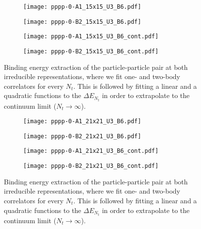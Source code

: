 \begin{figure}
  \begin{subfigure}{.5\textwidth}
    \centering
    \texttt{[image: pppp-0-A1\_15x15\_U3\_B6.pdf]}
  \end{subfigure}%
  \begin{subfigure}{.5\textwidth}
    \centering
    \texttt{[image: pppp-0-B2\_15x15\_U3\_B6.pdf]}
  \end{subfigure}
  \begin{subfigure}{.5\textwidth}
      \centering
      \texttt{[image: pppp-0-A1\_15x15\_U3\_B6\_cont.pdf]}
  \end{subfigure}
  \begin{subfigure}{.5\textwidth}
      \centering
      \texttt{[image: pppp-0-B2\_15x15\_U3\_B6\_cont.pdf]}
  \end{subfigure}
  \caption{Binding energy extraction of the particle-particle pair at both irreducible representations, where we fit one- and two-body correlators for every $N_t$. This is followed by fitting a linear and a quadratic functions to the $\Delta E_{N_t}$ in order to extrapolate to the continuum limit ($N_t\to\infty$).}
  \label{fig:fig9}
\end{figure}

\begin{figure}
  \begin{subfigure}{.5\textwidth}
    \centering
    \texttt{[image: pppp-0-A1\_21x21\_U3\_B6.pdf]}
  \end{subfigure}%
  \begin{subfigure}{.5\textwidth}
    \centering
    \texttt{[image: pppp-0-B2\_21x21\_U3\_B6.pdf]}
  \end{subfigure}
  \begin{subfigure}{.5\textwidth}
      \centering
      \texttt{[image: pppp-0-A1\_21x21\_U3\_B6\_cont.pdf]}
  \end{subfigure}
  \begin{subfigure}{.5\textwidth}
      \centering
      \texttt{[image: pppp-0-B2\_21x21\_U3\_B6\_cont.pdf]}
  \end{subfigure}
  \caption{Binding energy extraction of the particle-particle pair at both irreducible representations, where we fit one- and two-body correlators for every $N_t$. This is followed by fitting a linear and a quadratic functions to the $\Delta E_{N_t}$ in order to extrapolate to the continuum limit ($N_t\to\infty$).}
  \label{fig:fig10}
\end{figure}
 
